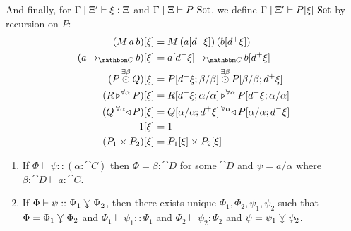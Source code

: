 \documentclass{llncs}
\begin{document}
\begin{definition}
  And finally, for $\Gamma \mathrel{|} \Xi' \vdash \xi : \Xi$ and $\Gamma \mathrel{|} \Xi \vdash P \,\,\textrm{Set}$,
  we define $\Gamma \mathrel{|} \Xi' \vdash P[\xi] \,\,\textrm{Set}$ by recursion on $P$:
  \begin{align*}
    (M\,a\,b)[\xi] &= M\,(a[d^-\xi])\,(b[d^+\xi])\\
    (\punitinXfromYtoZ {\cat C} a b)[\xi] &= \punitinXfromYtoZ {\cat C} {a[d^- \xi]}{b[d^+ \xi]}\\
    (\tensorexistsXwithYandZ \beta P Q)[\xi] &= \tensorexistsXwithYandZ \beta {P[d^-\xi;\beta/\beta]}{P[\beta/\beta;d^+\xi]}\\
    (\homrallXYtoZ \alpha R P)[\xi] &= \homrallXYtoZ \alpha {R[d^+\xi;\alpha/\alpha]} {P[d^-\xi;\alpha/\alpha]}\\
    (\homlallXYtoZ \alpha P Q)[\xi] &= \homlallXYtoZ \alpha {P[\alpha/\alpha;d^-\xi]} {Q[\alpha/\alpha;d^+\xi]}\\
    1[\xi] &= 1\\
    (P_1 \times P_2)[\xi] &= P_1[\xi] \times P_2[\xi]
  \end{align*}
\end{definition}

\begin{lemma}[Inversion]
  \label{lem:inversion}
  \begin{enumerate}
  \item If $\Phi \vdash \psi :: (\alpha:\cat C)$ then $\Phi =
    \beta:\cat D$ for some $\cat D$ and $\psi = a/\alpha$ where
    $\beta:\cat D \vdash a : \cat C$.
  \item If $\Phi \vdash \psi :: \Psi_1 \curlyveedownarrow \Psi_2$, then there
    exists unique $\Phi_1,\Phi_2,\psi_1,\psi_2$ such that $\Phi =
    \Phi_1\curlyveedownarrow\Phi_2$ and $\Phi_1\vdash\psi_1 :: \Psi_1$ and
    $\Phi_2\vdash \psi_2 : \Psi_2$ and $\psi = \psi_1\curlyveedownarrow\psi_2$.
  \end{enumerate}
\end{lemma}




\end{document}

